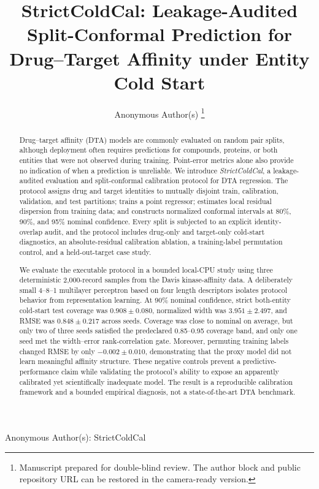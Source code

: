 \documentclass[lettersize,journal]{IEEEtran}
\begin{document}
\title{StrictColdCal: Leakage-Audited Split-Conformal Prediction for Drug--Target Affinity under Entity Cold Start}

\author{Anonymous Author(s)%
\thanks{Manuscript prepared for double-blind review. The author block and public repository URL can be restored in the camera-ready version.}}

%
{Anonymous Author(s): StrictColdCal}

\maketitle

\begin{abstract}
Drug--target affinity (DTA) models are commonly evaluated on random pair splits, although deployment often requires predictions for compounds, proteins, or both entities that were not observed during training. Point-error metrics alone also provide no indication of when a prediction is unreliable. We introduce \emph{StrictColdCal}, a leakage-audited evaluation and split-conformal calibration protocol for DTA regression. The protocol assigns drug and target identities to mutually disjoint train, calibration, validation, and test partitions; trains a point regressor; estimates local residual dispersion from training data; and constructs normalized conformal intervals at 80\%, 90\%, and 95\% nominal confidence. Every split is subjected to an explicit identity-overlap audit, and the protocol includes drug-only and target-only cold-start diagnostics, an absolute-residual calibration ablation, a training-label permutation control, and a held-out-target case study.

We evaluate the executable protocol in a bounded local-CPU study using three deterministic 2,000-record samples from the Davis kinase-affinity data. A deliberately small 4--8--1 multilayer perceptron based on four length descriptors isolates protocol behavior from representation learning. At 90\% nominal confidence, strict both-entity cold-start test coverage was $0.908\pm0.080$, normalized width was $3.951\pm2.497$, and RMSE was $0.848\pm0.217$ across seeds. Coverage was close to nominal on average, but only two of three seeds satisfied the predeclared 0.85--0.95 coverage band, and only one seed met the width--error rank-correlation gate. Moreover, permuting training labels changed RMSE by only $-0.002\pm0.010$, demonstrating that the proxy model did not learn meaningful affinity structure. These negative controls prevent a predictive-performance claim while validating the protocol's ability to expose an apparently calibrated yet scientifically inadequate model. The result is a reproducible calibration framework and a bounded empirical diagnosis, not a state-of-the-art DTA benchmark.
\end{abstract}
\end{document}
